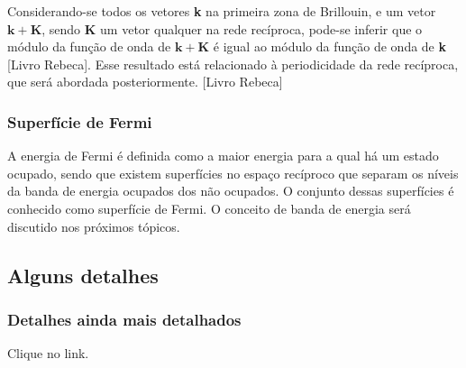 \documentclass[11pt]{article}
\numberwithin{equation}{section}
\begin{document}
      \par Considerando-se todos os vetores \textbf{k} na primeira zona de Brillouin, e um vetor $\mathbf{k}+\mathbf{K}$, sendo \textbf{K} um vetor qualquer na rede recíproca, pode-se inferir que o módulo da função de onda de $\mathbf{k}+\mathbf{K}$ é igual ao módulo da função de onda  de \textbf{k} [Livro Rebeca]. Esse resultado está relacionado à periodicidade da rede recíproca, que será abordada posteriormente. [Livro Rebeca]

    \subsubsection{Superfície de Fermi}

      \par A energia de Fermi é definida como a maior energia para a qual há um estado ocupado, sendo que existem superfícies no espaço recíproco que separam os níveis da banda de energia ocupados dos não ocupados. O conjunto dessas superfícies é conhecido como superfície de Fermi. O conceito de banda de energia será discutido nos próximos tópicos.


 
\subsection{Alguns detalhes}


\subsubsection{Detalhes ainda mais detalhados}
Clique no link.
\end{document}
